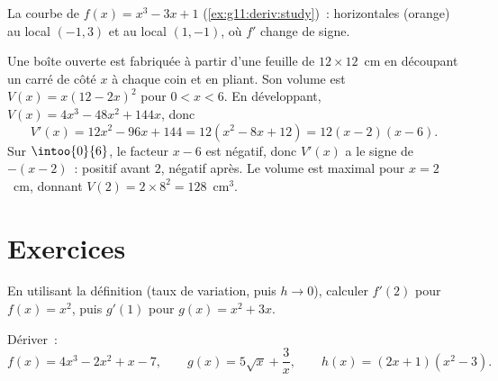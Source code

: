\begin{omfigure}

{\small La courbe de $f(x) = x^3 - 3x + 1$
(\cref{ex:g11:deriv:study})~:  horizontales (orange) au
 local $(-1, 3)$ et au  local $(1, -1)$, où $f'$ change de
signe.}
\end{omfigure}

\begin{example}[Optimisation]\label{ex:g11:deriv:box}
Une boîte ouverte est fabriquée à partir d'une feuille de
$12 \times 12$~cm en découpant un carré de côté $x$ à chaque coin et en
pliant. Son volume est $V(x) = x(12 - 2x)^2$ pour $0 < x < 6$. En
développant, $V(x) = 4x^3 - 48x^2 + 144x$, donc
\[
V'(x) = 12x^2 - 96x + 144 = 12(x^2 - 8x + 12) = 12(x - 2)(x - 6).
\]
Sur $\intoo{0}{6}$, le facteur $x - 6$ est négatif, donc $V'(x)$ a le
signe de $-(x-2)$~: positif avant $2$, négatif après. Le volume est
maximal pour $x = 2$~cm, donnant $V(2) = 2 \times 8^2 = 128$~cm$^3$.
\end{example}

\section{Exercices}

\begin{exercise}[$\star$]\label{exo:g11:deriv:1}
En utilisant la définition (taux de variation, puis $h \to 0$), calculer
$f'(2)$ pour $f(x) = x^2$, puis $g'(1)$ pour $g(x) = x^2 + 3x$.
\end{exercise}

\begin{exercise}[$\star$]\label{exo:g11:deriv:2}
Dériver~:
\[
f(x) = 4x^3 - 2x^2 + x - 7, \qquad
g(x) = 5\sqrt{x} + \frac{3}{x}, \qquad
h(x) = (2x+1)(x^2 - 3) .
\]
\end{exercise}

